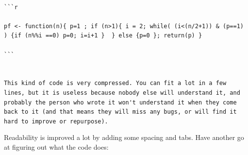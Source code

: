 \documentclass[]{book}
\begin{document}
\begin{verbatim}
                                                                                                                                                                                                                                                            ```r
                                                                                                                                                                                                                                                                                                                                                                                                                                                                                                                          pf <- function(n){ p=1 ; if (n>1){ i = 2; while( (i<(n/2+1)) & (p==1) ) {if (n%%i ==0) p=0; i=i+1 }  } else {p=0 }; return(p) }
                                                                                                                                                                                                                                                            ```
                                                                                                                                                                                                                                                          
                                                                                                                                                                                                                                                          This kind of code is very compressed. You can fit a lot in a few lines, but it is useless because nobody else will understand it, and probably the person who wrote it won't understand it when they come back to it (and that means they will miss any bugs, or will find it hard to improve or repurpose).
\end{verbatim}

Readability is improved a lot by adding some spacing and tabs. Have
another go at figuring out what the code does:
\end{document}
